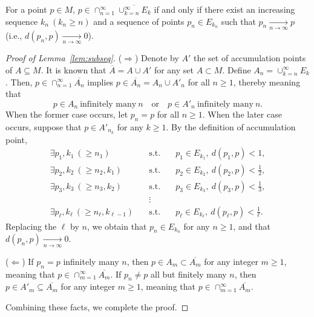 \documentclass[10pt,a4paper]{amsart}
\begin{document}
\begin{lemma}\label{lem:subseq}
For a point $p \in M$, $p \in \cap_{n=1}^{\infty}\overline{\cup_{k=n}^{\infty}E_{k}}$ if and only if there exist an increasing sequence $k_{n} ~ (k_{n} \ge n)$ and a sequence of points $p_{n} \in E_{k_{n}}$ such that $p_{n} \underset{n \rightarrow \infty}{\rightarrow} p$ (i.e., $d(p_{n}, p) \underset{n \rightarrow \infty}{\rightarrow} 0$).
\end{lemma}

\begin{proof}[Proof of Lemma~\ref{lem:subseq}]
($\Rightarrow$) Denote by $A'$ the set of accumulation points of $A \subseteq M$. It is known that $\overline{A}=A \cup A'$ for any set $A \subset M$. Define $A_{n}=\cup_{k=n}^{\infty}E_k$. Then, $p \in \cap_{n=1}^{\infty}\overline{A_{n}}$ implies $p \in \overline{A_{n}}=A_{n} \cup A'_{n}$ for all $n\ge 1$, thereby meaning that
\[
p \in A_{n} ~ \mbox{infinitely many} ~ n \quad \mbox{or} \quad p \in A'_{n} ~ \mbox{infinitely many}~ n.
\]
When the former case occurs, let $p_{n}=p$ for all $n \ge 1$. When the later case occurs, suppose that $p \in A'_{n_{k}}$ for any $k \ge 1$. By the definition of accumulation point,
\begin{eqnarray*}
\exists p_{1}, k_{1}~(\ge n_1) \quad &\mbox{s.t.}& \quad p_1 \in E_{k_1},~ d(p_1,p)<1, \\
\exists p_{2}, k_{2}~(\ge n_2, k_1) \quad &\mbox{s.t.}& \quad p_2 \in E_{k_2}, ~ d(p_2,p)<\frac{1}{2}, \\
\exists p_{3}, k_{3}~(\ge n_3, k_2) \quad &\mbox{s.t.}& \quad p_3 \in E_{k_3}, ~ d(p_3,p)<\frac{1}{3}, \\
&\vdots& \\
\exists p_{\ell}, k_{\ell}~(\ge n_\ell, k_{\ell-1}) \quad &\mbox{s.t.}& \quad p_\ell \in E_{k_\ell}, ~ d(p_\ell,p)<\frac{1}{\ell}.
\end{eqnarray*}
Replacing the $\ell$ by $n$, we obtain that $p_{n} \in E_{k_{n}}$ for any $n \ge 1$, and that $d(p_{n}, p) \underset{n \rightarrow \infty}{\rightarrow} 0$.  

($\Leftarrow$) If $p_{n}=p$ infinitely many $n$, then $p \in A_{m} \subset \overline{A_{m}}$ for any integer $m \ge 1$, meaning that $p \in \cap_{m=1}^{\infty} \overline{A_{m}}$. If $p_{n} \neq p$ all but finitely many $n$, then $p \in A'_{m} \subseteq \overline{A_{m}}$ for any integer $m\ge 1$, meaning that $p \in \cap_{m=1}^{\infty} \overline{A_{m}}$. 



Combining these facts, we complete the proof.    
\end{proof}
\end{document}
